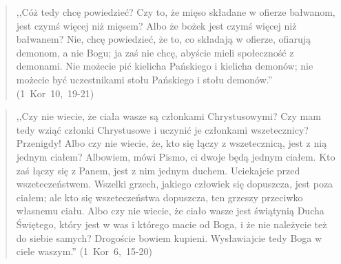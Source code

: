 \documentclass[10pt,a4paper,oneside]{article}
\begin{document}
\begin{quote}
,,Cóż tedy chcę powiedzieć? Czy to, że mięso składane w ofierze bałwanom, jest czymś więcej niż mięsem? Albo że bożek jest czymś więcej niż bałwanem? Nie, chcę powiedzieć, że to, co składają w ofierze, ofiarują demonom, a nie Bogu; ja zaś nie chcę, abyście mieli społeczność z demonami. Nie możecie pić kielicha Pańskiego i kielicha demonów; nie możecie być uczestnikami stołu Pańskiego i stołu demonów.'' (1~Kor~10,~19-21)
\end{quote}
\begin{quote}
,,Czy nie wiecie, że ciała wasze są członkami Chrystusowymi? Czy mam tedy wziąć członki Chrystusowe i uczynić je członkami wszetecznicy? Przenigdy! Albo czy nie wiecie, że, kto się łączy z wszetecznicą, jest z nią jednym ciałem? Albowiem, mówi Pismo, ci dwoje będą jednym ciałem. Kto zaś łączy się z Panem, jest z nim jednym duchem. Uciekajcie przed wszeteczeństwem. Wszelki grzech, jakiego człowiek się dopuszcza, jest poza ciałem; ale kto się wszeteczeństwa dopuszcza, ten grzeszy przeciwko własnemu ciału. Albo czy nie wiecie, że ciało wasze jest świątynią Ducha Świętego, który jest w was i którego macie od Boga, i że nie należycie też do siebie samych? Drogoście bowiem kupieni. Wysławiajcie tedy Boga w ciele waszym.'' (1~Kor~6,~15-20)
\end{quote}
\end{document}
